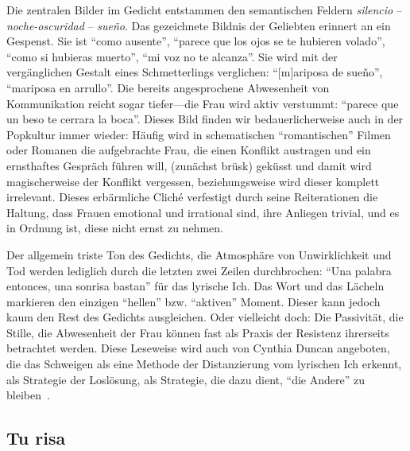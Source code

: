 Die zentralen Bilder im Gedicht entstammen den semantischen Feldern \textit{silencio} -- \textit{noche-oscuridad} -- \textit{sueño}.
Das gezeichnete Bildnis der Geliebten erinnert an ein Gespenst.
Sie ist ``como ausente'', ``parece que los ojos se te hubieren volado'', ``como si hubieras muerto'', ``mi voz no te alcanza''.
Sie wird mit der vergänglichen Gestalt eines Schmetterlings verglichen: ``[m]ariposa de sueño'', ``mariposa en arrullo''.
Die bereits angesprochene Abwesenheit von Kommunikation reicht sogar tiefer—die Frau wird aktiv verstummt: ``parece que un beso te cerrara la boca''.
Dieses Bild finden wir bedauerlicherweise auch in der Popkultur immer wieder:
Häufig wird in schematischen ``romantischen'' Filmen oder Romanen die aufgebrachte Frau, die einen Konflikt austragen und ein ernsthaftes Gespräch führen will, (zunächst brüsk) geküsst und damit wird magischerweise der Konflikt vergessen, beziehungsweise wird dieser komplett irrelevant.
Dieses erbärmliche Cliché verfestigt durch seine Reiterationen die Haltung, dass Frauen emotional und irrational sind, ihre Anliegen trivial, und es in Ordnung ist, diese nicht ernst zu nehmen.

Der allgemein triste Ton des Gedichts, die Atmosphäre von Unwirklichkeit und Tod werden lediglich durch die letzten zwei Zeilen durchbrochen: ``Una palabra entonces, una sonrisa bastan'' für das lyrische Ich.
Das Wort und das Lächeln markieren den einzigen ``hellen'' bzw. ``aktiven'' Moment.
Dieser kann jedoch kaum den Rest des Gedichts ausgleichen.
Oder vielleicht doch: Die Passivität, die Stille, die Abwesenheit der Frau können fast als Praxis der Resistenz ihrerseits betrachtet werden.
Diese Leseweise wird auch von Cynthia Duncan angeboten, die das Schweigen als eine Methode der Distanzierung vom lyrischen Ich erkennt, als Strategie der Loslösung, als Strategie, die dazu dient, ``die Andere'' zu bleiben~\cite{Duncan1992}.

\begin{comment}
  * 4 x 4Line verse: Quartette (lookup wie das korrekt heißt auf Deutsch!) + 2 x 2Zeiler (Couplets) --> erinnert ein bisschen an Sonnetform aber nicht ganz (Wie heißen nochma die verschiedene Sonnetformen? Nicht die von Gongora sondern die von Shakespeare meine ich grad: 3x4Zeilen und dann 2)
\end{comment}

\subsection{Tu risa}


